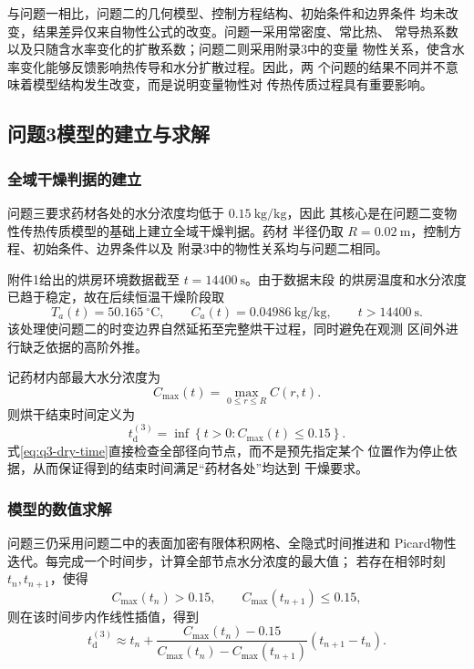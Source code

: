 \documentclass[12pt,a4paper]{article}
\renewcommand{\boxed}[1]{#1}
\begin{document}
与问题一相比，问题二的几何模型、控制方程结构、初始条件和边界条件
均未改变，结果差异仅来自物性公式的改变。问题一采用常密度、常比热、
常导热系数以及只随含水率变化的扩散系数；问题二则采用附录3中的变量
物性关系，使含水率变化能够反馈影响热传导和水分扩散过程。因此，两
个问题的结果不同并不意味着模型结构发生改变，而是说明变量物性对
传热传质过程具有重要影响。
\subsection{问题3模型的建立与求解}

\subsubsection{全域干燥判据的建立}

问题三要求药材各处的水分浓度均低于 $0.15\ \mathrm{kg/kg}$，因此
其核心是在问题二变物性传热传质模型的基础上建立全域干燥判据。药材
半径仍取 $R=0.02\ \mathrm{m}$，控制方程、初始条件、边界条件以及
附录3中的物性关系均与问题二相同。

附件1给出的烘房环境数据截至 $t=14400\ \mathrm{s}$。由于数据末段
的烘房温度和水分浓度已趋于稳定，故在后续恒温干燥阶段取
\begin{equation}
T_a(t)=50.165\ ^\circ\mathrm{C},\qquad
C_a(t)=0.04986\ \mathrm{kg/kg},\qquad t>14400\ \mathrm{s}.
\label{eq:q3-environment-extension}
\end{equation}
该处理使问题二的时变边界自然延拓至完整烘干过程，同时避免在观测
区间外进行缺乏依据的高阶外推。

记药材内部最大水分浓度为
\begin{equation}
C_{\max}(t)=\max_{0\leq r\leq R}C(r,t).
\label{eq:q3-cmax}
\end{equation}
则烘干结束时间定义为
\begin{equation}
\boxed{
t_{\mathrm d}^{(3)}
=\inf\left\{t>0:C_{\max}(t)\leq0.15\right\}
}.
\label{eq:q3-dry-time}
\end{equation}
式\eqref{eq:q3-dry-time}直接检查全部径向节点，而不是预先指定某个
位置作为停止依据，从而保证得到的结束时间满足“药材各处”均达到
干燥要求。

\subsubsection{模型的数值求解}

问题三仍采用问题二中的表面加密有限体积网格、全隐式时间推进和
Picard物性迭代。每完成一个时间步，计算全部节点水分浓度的最大值；
若存在相邻时刻 $t_n,t_{n+1}$，使得
\begin{equation}
C_{\max}(t_n)>0.15,\qquad
C_{\max}(t_{n+1})\leq0.15,
\end{equation}
则在该时间步内作线性插值，得到
\begin{equation}
t_{\mathrm d}^{(3)}
\approx t_n+
\frac{C_{\max}(t_n)-0.15}
{C_{\max}(t_n)-C_{\max}(t_{n+1})}
(t_{n+1}-t_n).
\label{eq:q3-time-interpolation}
\end{equation}
\end{document}
